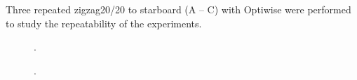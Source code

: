 Three repeated zigzag20/20 to starboard (A -- C) with Optiwise were performed to study the repeatability of the experiments. 

\begin{figure}[h!]
    \centering   
    
    \caption{.}
    \label{fig:diff1}
\end{figure}

\begin{figure}[h!]
    \centering   
    
    \caption{.}
    \label{fig:diff2}
\end{figure}